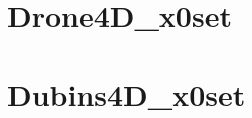\documentclass{article}
\begin{document}
\begin{center}\end{center}
\section*{Drone4D\_x0set}
\noindent
\begin{minipage}[b]{0.24\textwidth}\end{minipage}\hfill
\begin{minipage}[b]{0.24\textwidth}\end{minipage}\hfill
\begin{minipage}[b]{0.24\textwidth}\end{minipage}\hfill
\begin{minipage}[b]{0.24\textwidth}\end{minipage}\hfill

\section*{Dubins4D\_x0set}
\noindent
\begin{minipage}[b]{0.24\textwidth}\end{minipage}\hfill
\begin{minipage}[b]{0.24\textwidth}\end{minipage}\hfill
\begin{minipage}[b]{0.24\textwidth}\end{minipage}\hfill
\begin{minipage}[b]{0.24\textwidth}\end{minipage}\hfill
\end{document}
